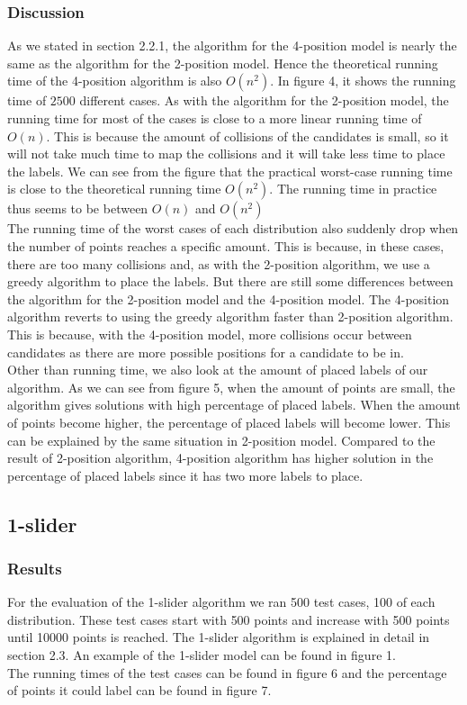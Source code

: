 \documentclass[crop=false,a4paper,oneside,11pt]{standalone}
\begin{document}
\subsubsection{Discussion}
As we stated in section 2.2.1, the algorithm for the 4-position model is nearly the same as the algorithm for the 2-position model. Hence the theoretical running time of the 4-position algorithm is also $O(n^2)$. In figure 4, it shows the running time of $2500$ different cases. As with the algorithm for the 2-position model, the running time for most of the cases is close to a more linear running time of $O(n)$. This is because the amount of collisions of the candidates is small, so it will not take much time to map the collisions and it will take less time to place the labels. We can see from the figure that the practical worst-case running time is close to the theoretical running time $O(n^2)$. The running time in practice thus seems to be between $O(n)$ and $O(n^2)$  \\
The running time of the worst cases of each distribution also suddenly drop when the number of points reaches a specific amount. This is because, in these cases, there are too many collisions and, as with the 2-position algorithm, we use a greedy algorithm to place the labels. But there are still some differences between the algorithm for the 2-position model and the 4-position model. The 4-position algorithm reverts to using the greedy algorithm faster than 2-position algorithm. This is because, with the 4-position model, more collisions occur between candidates as there are more possible positions for a candidate to be in.\\
Other than running time, we also look at the amount of placed labels of our algorithm. As we can see from figure 5, when the amount of points are small, the algorithm gives solutions with high percentage of placed labels. When the amount of points become higher, the percentage of placed labels will become lower. This can be explained by the same situation in 2-position model. Compared to the result of 2-position algorithm, 4-position algorithm has higher solution in the percentage of placed labels since it has two more labels to place.\\


\subsection{1-slider}
\subsubsection{Results}
For the evaluation of the 1-slider algorithm we ran 500 test cases, 100 of each distribution. These test cases start with 500 points and increase with 500 points until 10000 points is reached. The 1-slider algorithm is explained in detail in section 2.3. An example of the 1-slider model can be found in figure 1.\\
 The running times of the test cases can be found in figure 6 and the percentage of points it could label can be found in figure 7.
\end{document}
